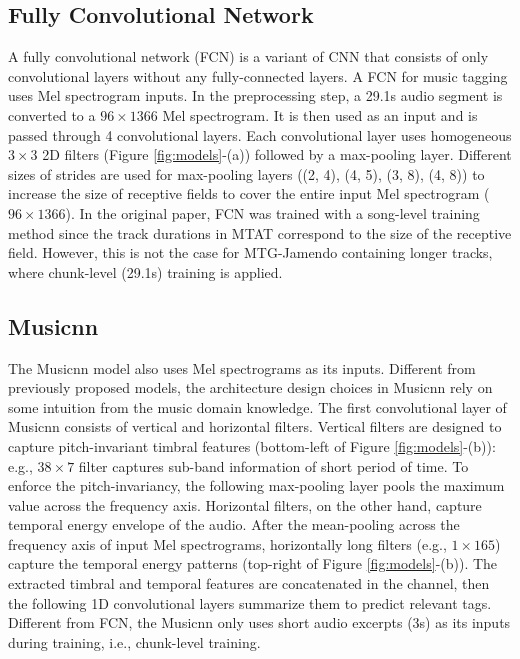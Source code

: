 \documentclass{article}
\begin{document}
\subsection{Fully Convolutional Network}\label{sec:FCN}
A fully convolutional network (FCN) is a variant of CNN that consists of only convolutional layers without any fully-connected layers. A FCN for music tagging \cite{choi2016automatic} uses Mel spectrogram inputs. In the preprocessing step, a 29.1s audio segment is converted to a $96 \times 1366$ Mel spectrogram. It is then used as an input and is passed through 4 convolutional layers. Each convolutional layer uses homogeneous $3 \times 3$ 2D filters (Figure \ref{fig:models}-(a)) followed by a max-pooling layer. Different sizes of strides are used for max-pooling layers ((2, 4), (4, 5), (3, 8), (4, 8)) to increase the size of receptive fields to cover the entire input Mel spectrogram ($96 \times 1366$). In the original paper, FCN was trained with a song-level training method since the track durations in MTAT correspond to the size of the receptive field. 
However, this is not the case for MTG-Jamendo containing longer tracks, where chunk-level (29.1s) training is applied.



\subsection{Musicnn}\label{sec:Musicnn}
The Musicnn \cite{pons2018end} model also uses Mel spectrograms as its inputs. 
Different from previously proposed models, the architecture design choices in Musicnn rely on some intuition from the music domain knowledge.
The first convolutional layer of Musicnn consists of vertical and horizontal filters. Vertical filters are designed to capture pitch-invariant timbral features (bottom-left of Figure \ref{fig:models}-(b)): e.g., $38 \times 7$ filter captures sub-band information of short period of time. To enforce the pitch-invariancy, the following max-pooling layer pools the maximum value across the frequency axis. Horizontal filters, on the other hand, capture temporal energy envelope of the audio. 
After the mean-pooling across the frequency axis of input Mel spectrograms, horizontally long filters (e.g., $1 \times 165$) capture the temporal energy patterns (top-right of Figure \ref{fig:models}-(b)). The extracted timbral and temporal features are concatenated in the channel, then the following 1D convolutional layers summarize them to predict relevant tags. Different from FCN, the Musicnn only uses short audio excerpts (3s) as its inputs during training, i.e., chunk-level training.
\end{document}
